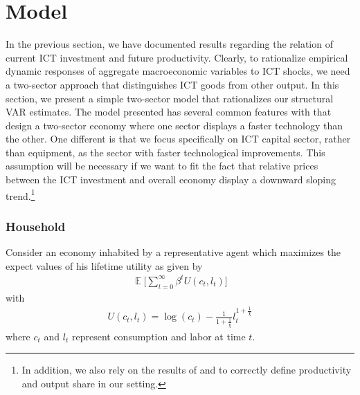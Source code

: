 \documentclass[12pt]{article}
\DeclareMathOperator{\E}{\mathbb{E}}
\begin{document}


\section{Model}\label{section:theory}

In the previous section, we have documented results regarding the relation of current ICT investment and future productivity. Clearly, to rationalize empirical dynamic responses of aggregate macroeconomic variables to ICT shocks, we need a two-sector approach that distinguishes ICT goods from other output. In this section, we present a simple two-sector model that rationalizes our structural VAR estimates. The model presented has several common features with \cite{greenwood1997long} that design a two-sector economy where one sector displays a faster technology than the other. One different is that we focus specifically on ICT capital sector, rather than equipment, as the sector with faster technological improvements. This assumption will be necessary if we want to fit the fact that relative prices between the ICT investment and overall economy display a downward sloping trend.\footnote{In addition, we also rely on the results of \cite{whelan2003two} and \cite{oulton2007investment} to correctly define productivity and output share in our setting.}

\subsubsection{Household}

Consider an economy inhabited by a representative agent which maximizes the expect values of his lifetime utility as given by
\begin{eqnarray}\label{equation:utilFunc}
\E \Bigg[  \sum_{t=0}^{\infty} \beta^t U(c_t,l_t)  \Bigg]
\end{eqnarray}
with 
\begin{eqnarray*}
U(c_t,l_t) = \log(c_t) - \frac{1}{1+\frac{1}{\chi}} l_t^{1+\frac{1}{\chi}}
\end{eqnarray*}
where $c_t$ and $l_t$ represent consumption and labor at time $t$. 
\end{document}
